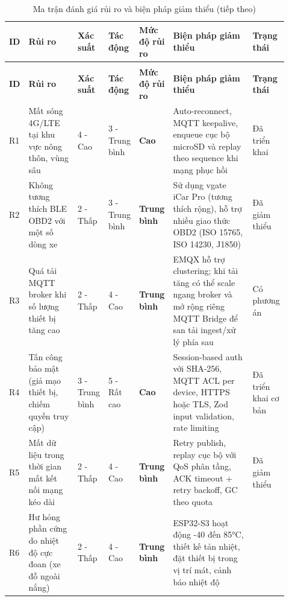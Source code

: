 \documentclass[a4paper]{extarticle}
\newcommand{\thesissettableid}[2]{%
  \renewcommand{\thetable}{#1}%
  \renewcommand{\theHtable}{#2}%
}
\begin{document}
{\thesissettableid{5.8}{tab-ch5-ma-tran-anh-gia-rui-ro-va-bien-phap-giam-thieu}
\def\LTcaptype{table}
\begin{longtable}{|L{0.055\linewidth}|L{0.180\linewidth}|L{0.090\linewidth}|L{0.090\linewidth}|L{0.120\linewidth}|L{0.300\linewidth}|L{0.090\linewidth}|}
\caption{Ma trận đánh giá rủi ro và biện pháp giảm thiểu}\label{tab:ch5-ma-tran-anh-gia-rui-ro-va-bien-phap-giam-thieu}\\
\hline \textbf{ID} & \textbf{Rủi ro} & \textbf{Xác suất} & \textbf{Tác động} & \textbf{Mức độ rủi ro} & \textbf{Biện pháp giảm thiểu} & \textbf{Trạng thái} \\
\hline
\endfirsthead
\caption[]{Ma trận đánh giá rủi ro và biện pháp giảm thiểu (tiếp theo)}\\
\hline \textbf{ID} & \textbf{Rủi ro} & \textbf{Xác suất} & \textbf{Tác động} & \textbf{Mức độ rủi ro} & \textbf{Biện pháp giảm thiểu} & \textbf{Trạng thái} \\
\hline
\endhead
\hline
\endfoot
\endlastfoot
R1 & Mất sóng 4G/LTE tại khu vực nông thôn, vùng sâu & 4 - Cao & 3 -
Trung bình & \textbf{Cao} & Auto-reconnect, MQTT keepalive, enqueue cục
bộ microSD và replay theo sequence khi mạng phục hồi & Đã triển khai \\\hline
R2 & Không tương thích BLE OBD2 với một số dòng xe & 2 - Thấp & 3 -
Trung bình & \textbf{Trung bình} & Sử dụng vgate iCar Pro (tương thích
rộng), hỗ trợ nhiều giao thức OBD2 (ISO 15765, ISO 14230, J1850) & Đã
giảm thiểu \\\hline
R3 & Quá tải MQTT broker khi số lượng thiết bị tăng cao & 2 - Thấp & 4 -
Cao & \textbf{Trung bình} & EMQX hỗ trợ clustering; khi tải tăng có thể
scale ngang broker và mở rộng riêng MQTT Bridge để san tải ingest/xử lý
phía sau & Có phương án \\\hline
R4 & Tấn công bảo mật (giả mạo thiết bị, chiếm quyền truy cập) & 3 -
Trung bình & 5 - Rất cao & \textbf{Cao} & Session-based auth với
SHA-256, MQTT ACL per device, HTTPS hoặc TLS, Zod input validation, rate
limiting & Đã triển khai cơ bản \\\hline
R5 & Mất dữ liệu trong thời gian mất kết nối mạng kéo dài & 2 - Thấp & 4
- Cao & \textbf{Trung bình} & Retry publish, replay cục bộ với QoS phân
tầng, ACK timeout + retry backoff, GC theo quota & Đã giảm thiểu \\\hline
R6 & Hư hỏng phần cứng do nhiệt độ cực đoan (xe đỗ ngoài nắng) & 2 -
Thấp & 4 - Cao & \textbf{Trung bình} & ESP32-S3 hoạt động -40 đến 85°C,
thiết kế tản nhiệt, đặt thiết bị trong vị trí mát, cảnh báo nhiệt độ &

\end{longtable}}
\end{document}
